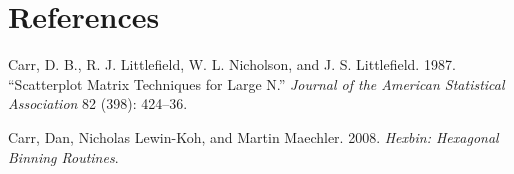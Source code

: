 \section*{References}

Carr, D. B., R. J. Littlefield, W. L. Nicholson, and J. S. Littlefield.
1987. ``Scatterplot Matrix Techniques for Large N.'' \emph{Journal of
the American Statistical Association} 82 (398): 424--36.

Carr, Dan, Nicholas Lewin-Koh, and Martin Maechler. 2008. \emph{Hexbin:
Hexagonal Binning Routines}.
